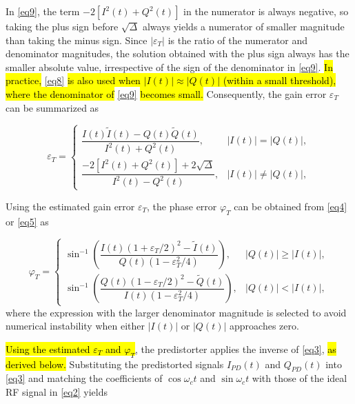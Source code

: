 \documentclass[lettersize,journal]{IEEEtran}
\begin{document}
In \eqref{eq9}, the term $-2[I^2(t)+Q^2(t)]$ in the numerator is always negative, so taking the plus sign before $\sqrt{\Delta}$ always yields a numerator of smaller magnitude than taking the minus sign.
Since $|\varepsilon_T|$ is the ratio of the numerator and denominator magnitudes, the solution obtained with the plus sign always has the smaller absolute value, irrespective of the sign of the denominator in \eqref{eq9}.
\hl{In practice,} \eqref{eq8} \hl{is also used when $|I(t)| \approx |Q(t)|$ (within a small threshold), where the denominator of} \eqref{eq9} \hl{becomes small.}
Consequently, the gain error $\varepsilon_T$ can be summarized as

\begin{equation}
\label{eq10}
\varepsilon_T =
\begin{cases}
\dfrac{I(t)\tilde{I}(t)-Q(t)\tilde{Q}(t)}{I^2(t)+Q^2(t)}, &|I(t)|=|Q(t)|, \\[1.5em]
\dfrac{-2\left[I^2(t)+Q^2(t)\right]+2\sqrt{\Delta}}{I^2(t)-Q^2(t)},&|I(t)|\neq |Q(t)|,
\end{cases}
\end{equation}

Using the estimated gain error $\varepsilon_T$, the phase error $\varphi_T$ can be obtained from \eqref{eq4} or \eqref{eq5} as

\begin{equation}
\label{eq11}
\varphi_T =
\begin{cases}
\sin^{-1}\left(\dfrac{I(t)(1+\varepsilon_T/2)^2 - \tilde{I}(t)}{Q(t)(1-\varepsilon_T^2/4)}\right), & |Q(t)| \geq |I(t)|, \\[3ex]
\sin^{-1}\left(\dfrac{Q(t)(1-\varepsilon_T/2)^2 - \tilde{Q}(t)}{I(t)(1-\varepsilon_T^2/4)}\right), & |Q(t)| < |I(t)|,
\end{cases}
\end{equation}
where the expression with the larger denominator magnitude is selected to avoid numerical instability when either $|I(t)|$ or $|Q(t)|$ approaches zero.

\hl{Using the estimated $\varepsilon_T$ and $\varphi_T$}, the predistorter applies the inverse of \eqref{eq3}, \hl{as derived below.}
Substituting the predistorted signals $I_{PD}(t)$ and $Q_{PD}(t)$ into \eqref{eq3} and matching the coefficients of $\cos \omega_c t$ and $\sin \omega_c t$ with those of the ideal RF signal in \eqref{eq2} yields
\end{document}
